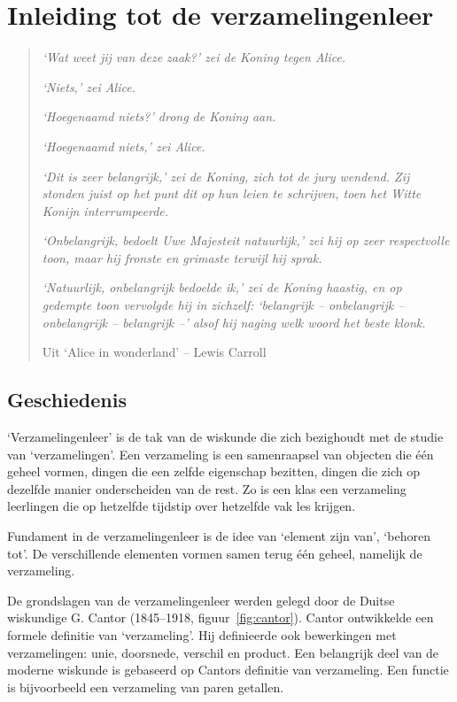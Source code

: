 

%
\chapter{Inleiding tot de verzamelingenleer}
\label{chap:verzamelingenleer}
\begin{quote}
\textit{`Wat weet jij van deze zaak?' zei de Koning tegen Alice.}

\textit{`Niets,' zei Alice.}

\textit{`\emph{Hoegenaamd} niets?' drong de Koning aan.}

\textit{`Hoegenaamd niets,' zei Alice.}

\textit{`Dit is zeer belangrijk,' zei de Koning, zich tot de jury wendend. Zij stonden juist op het punt dit op hun leien te schrijven, toen het Witte Konijn interrumpeerde.}

\textit{`\emph{On}belangrijk, bedoelt Uwe Majesteit natuurlijk,' zei hij op zeer respectvolle toon, maar hij fronste en grimaste terwijl hij sprak.}

\textit{`Natuurlijk, onbelangrijk bedoelde ik,' zei de Koning haastig, en op gedempte toon vervolgde hij in zichzelf: `belangrijk -- onbelangrijk -- onbelangrijk -- belangrijk --' alsof hij naging welk woord het beste klonk.}

          Uit `Alice in wonderland' -- Lewis Carroll
\end{quote}

\newpage
\section{Geschiedenis}
`Verzamelingenleer' is de tak van de wiskunde die zich bezighoudt met de studie van `verzamelingen'. Een verzameling is een samenraapsel van objecten die \'e\'en geheel vormen, dingen die een zelfde eigenschap bezitten, dingen die zich op dezelfde manier onderscheiden van de rest. Zo is een klas een verzameling leerlingen die op hetzelfde tijdstip over hetzelfde vak les krijgen.


Fundament in de verzamelingenleer is de idee van `element zijn van', `behoren tot'. De verschillende elementen vormen samen terug \'e\'en geheel, namelijk de verzameling.

De grondslagen van de verzamelingenleer werden gelegd door de Duitse 
wiskundige G. Cantor (1845--1918, figuur~\ref{fig:cantor}). 
Cantor ontwikkelde een formele definitie van `verzameling'. 
Hij definieerde ook bewerkingen met verzamelingen: unie, doorsnede, 
verschil en product. Een belangrijk deel van de moderne wiskunde is 
gebaseerd op Cantors definitie van verzameling.  Een functie is 
bijvoorbeeld een  verzameling van paren getallen.


